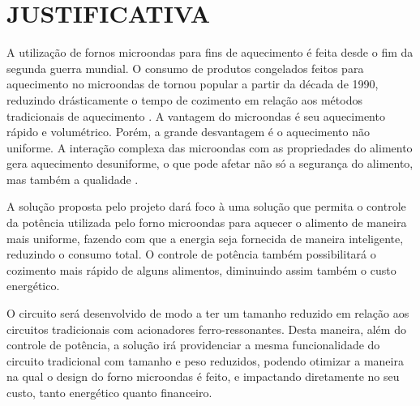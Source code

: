 \section{JUSTIFICATIVA}
\label{sec:justificativa}

A utilização de fornos microondas para fins de aquecimento é feita desde o fim da segunda guerra mundial. O consumo de produtos congelados feitos para aquecimento no microondas de tornou popular a partir da década de 1990, reduzindo drásticamente o tempo de cozimento em relação aos métodos tradicionais de aquecimento \cite{Ohlsson}. A vantagem do microondas é seu aquecimento rápido e volumétrico. Porém, a grande desvantagem é o aquecimento não uniforme. A interação complexa das microondas com as propriedades do alimento gera aquecimento desuniforme, o que pode afetar não só a segurança do alimento, mas também a qualidade \cite{Ma}.

A solução proposta pelo projeto dará foco à uma solução que permita o controle da potência utilizada pelo forno microondas para aquecer o alimento de maneira mais uniforme, fazendo com que a energia seja fornecida de maneira inteligente, reduzindo o consumo total. O controle de potência também possibilitará o cozimento mais rápido de alguns alimentos, diminuindo assim também o custo energético.

O circuito será desenvolvido de modo a ter um tamanho reduzido em relação aos circuitos tradicionais com acionadores ferro-ressonantes. Desta maneira, além do controle de potência, a solução irá providenciar a mesma funcionalidade do circuito tradicional com tamanho e peso reduzidos, podendo otimizar a maneira na qual o design do forno microondas é feito, e impactando diretamente no seu custo, tanto energético quanto financeiro.
